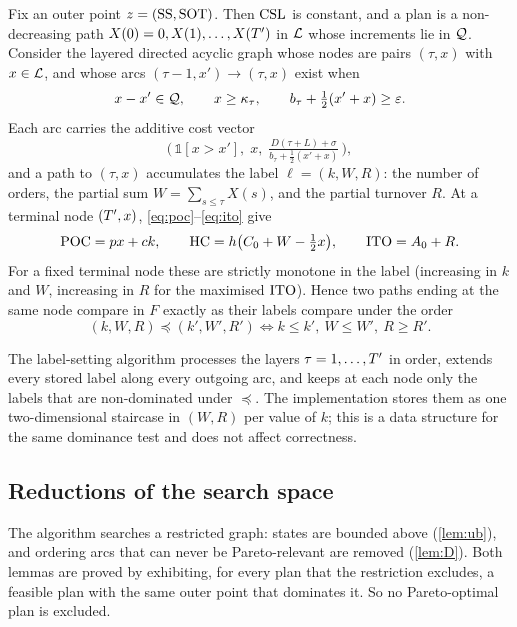Fix an outer point $z=(\mathrm{SS},\mathrm{SOT})$. Then $\mathrm{CSL}$ is constant, and a plan is a
non-decreasing path $X(0)=0,X(1),\dots,X(T')$ in $\mathcal{L}$ whose increments lie in $\mathcal{Q}$.
Consider the layered directed acyclic graph whose nodes are pairs $(\tau,x)$ with
$x\in\mathcal{L}$, and whose arcs $(\tau-1,x')\to(\tau,x)$ exist when
\begin{equation}\label{eq:arc}
  x-x'\in\mathcal{Q},\qquad x\ge\kappa_\tau,\qquad b_\tau+\tfrac12(x'+x)\ge\varepsilon .
\end{equation}
Each arc carries the additive cost vector
\begin{equation}\label{eq:arccost}
  \bigl(\,\mathbb{1}[x>x'],\; x,\; \tfrac{D(\tau+L)+\sigma}{b_\tau+\frac12(x'+x)}\,\bigr),
\end{equation}
and a path to $(\tau,x)$ accumulates the label $\ell=(k,W,R)$: the number of orders, the
partial sum $W=\sum_{s\le\tau}X(s)$, and the partial turnover $R$. At a terminal node
$(T',x)$, \eqref{eq:poc}--\eqref{eq:ito} give
\begin{equation}\label{eq:terminal}
  \mathrm{POC}=p x+c k,\qquad \mathrm{HC}=h\bigl(C_0+W-\tfrac12x\bigr),\qquad \mathrm{ITO}=A_0+R .
\end{equation}
For a fixed terminal node these are strictly monotone in the label (increasing in $k$
and $W$, increasing in $R$ for the maximised $\mathrm{ITO}$). Hence two paths ending at the same
node compare in $F$ exactly as their labels compare under the order
\begin{equation}
  (k,W,R)\preceq(k',W',R')\iff k\le k',\ W\le W',\ R\ge R'.
\end{equation}

The label-setting algorithm processes the layers $\tau=1,\dots,T'$ in order, extends
every stored label along every outgoing arc, and keeps at each node only the labels that
are non-dominated under $\preceq$. The implementation stores them as one
two-dimensional staircase in $(W,R)$ per value of $k$; this is a data structure for the
same dominance test and does not affect correctness.

\subsection{Reductions of the search space}\label{app:reductions}

The algorithm searches a restricted graph: states are bounded above (\cref{lem:ub}), and
ordering arcs that can never be Pareto-relevant are removed (\cref{lem:D}). Both lemmas
are proved by exhibiting, for every plan that the restriction excludes, a feasible plan
with the same outer point that dominates it. So no Pareto-optimal plan is excluded.

